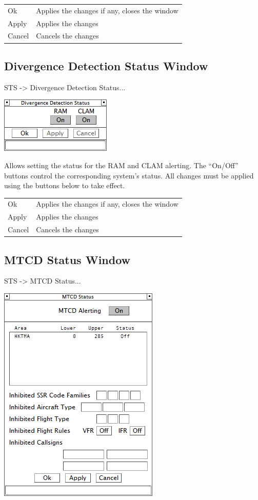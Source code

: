 \documentclass[11pt,a4paper]{memoir}
\begin{document}
\begin{tabular}{l l}
    Ok      & Applies the changes if any, closes the window\\
    Apply   & Applies the changes\\
    Cancel  & Cancels the changes\\
\end{tabular}

\subsection{Divergence Detection Status Window}
\label{win:ddsw}

\textit{} STS -> Divergence Detection Status...

\includegraphics{img/divsts.png}

Allows setting the status for the RAM and CLAM alerting. The “On/Off” buttons control the corresponding system’s status. All changes must be applied using the buttons below to take effect.

\begin{tabular}{l l}
    Ok      & Applies the changes if any, closes the window\\
    Apply   & Applies the changes\\
    Cancel  & Cancels the changes\\
\end{tabular}

\subsection{MTCD Status Window}
\label{win:mtcdsw}

\textit{} STS -> MTCD Status...

\includegraphics{img/mtcd.png}
\end{document}
